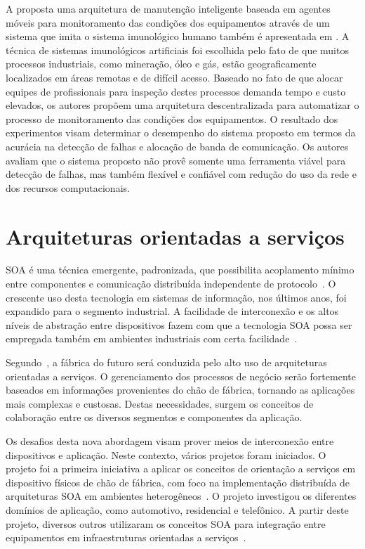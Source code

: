 A proposta uma arquitetura de manutenção inteligente baseada em agentes móveis para monitoramento
das condições dos equipamentos através de um sistema que imita o sistema imunológico humano também é
apresentada em \cite{hua2013mobile}. A técnica de sistemas imunológicos artificiais foi escolhida
pelo fato de que muitos processos industriais, como mineração, óleo e gás, estão geograficamente
localizados em áreas remotas e de difícil acesso. Baseado no fato de que alocar equipes de
profissionais para inspeção destes processos demanda tempo e custo elevados, os autores propõem uma
arquitetura descentralizada para automatizar o processo de monitoramento das condições dos
equipamentos. O resultado dos experimentos visam determinar o desempenho do sistema proposto em
termos da acurácia na detecção de falhas e alocação de banda de comunicação. Os autores avaliam que
o sistema proposto não provê somente uma ferramenta viável para detecção de falhas, mas também
flexível e confiável com redução do uso da rede e dos recursos computacionais.


\section{Arquiteturas orientadas a serviços}

\Gls{SOA} é uma técnica emergente, padronizada, que possibilita acoplamento mínimo entre componentes
e comunicação distribuída independente de protocolo~\cite{papazoglou2007service}. O crescente uso
desta tecnologia em sistemas de informação, nos últimos anos, foi expandido para o segmento
industrial. A facilidade de interconexão e os altos níveis de abstração entre dispositivos fazem com
que a tecnologia \gls{SOA} possa ser empregada também em ambientes industriais com certa
facilidade~\cite{moritz2008web}.

Segundo~\cite{cannata2010dynamic}, a fábrica do futuro será conduzida pelo alto uso de arquiteturas
orientadas a serviços. O gerenciamento dos processos de negócio serão fortemente baseados em
informações provenientes do chão de fábrica, tornando as aplicações mais complexas e custosas.
Destas necessidades, surgem os conceitos de colaboração entre os diversos segmentos e componentes da
aplicação.

Os desafios desta nova abordagem visam prover meios de interconexão entre dispositivos e aplicação.
Neste contexto, vários projetos foram iniciados. O projeto
 foi a primeira iniciativa a aplicar os conceitos de
orientação a serviços em dispositivo físicos de chão de fábrica, com foco na implementação
distribuída de arquiteturas \gls{SOA} em ambientes heterogêneos~\cite{jammes2005service}. O projeto
investigou os diferentes domínios de aplicação, como automotivo, residencial e telefônico. A partir
deste projeto, diversos outros utilizaram os conceitos \gls{SOA} para integração entre equipamentos
em infraestruturas orientadas a serviços~\cite{zeeb2007service}.

